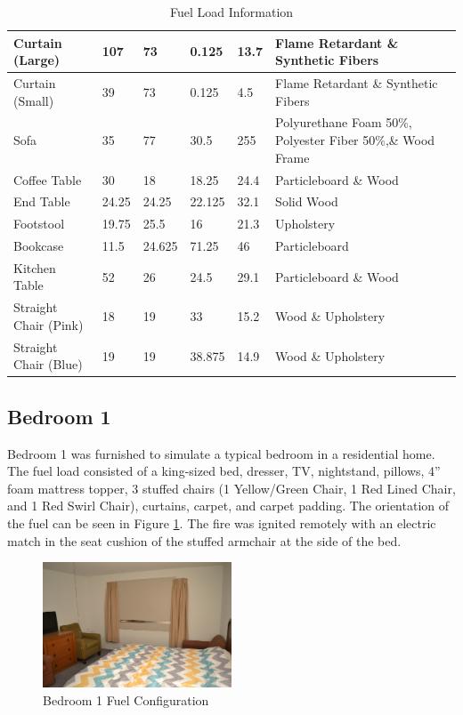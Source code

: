 \documentclass[12pt,oneside]{book}
\begin{document}
\begin{table}[H]
\begin{tabular}{|L{0.23\textwidth}|C{0.08\textwidth}|C{0.08\textwidth}|C{0.08\textwidth}|C{0.08\textwidth}|L{0.37\textwidth}|}
Curtain (Large) 			&107 			&73 			&0.125 			&13.7 			&Flame Retardant \& Synthetic Fibers \\ \hline
Curtain (Small) 			&39 			&73 			&0.125 			&4.5 			&Flame Retardant \& Synthetic Fibers \\ \hline
Sofa 						&35 			&77 			&30.5 			&255 			&Polyurethane Foam 50\%, Polyester Fiber 50\%,\& Wood Frame \\ \hline
Coffee Table 			 	&30 			&18 			&18.25 			&24.4 			&Particleboard \& Wood \\ \hline
End Table 			 		&24.25 			&24.25 			&22.125 		&32.1 			&Solid Wood \\ \hline
Footstool 					&19.75 			&25.5 			&16 			&21.3 			&Upholstery \\ \hline
Bookcase 					&11.5 			&24.625 		&71.25 			&46 			&Particleboard \\ \hline
Kitchen Table 				&52 			&26 			&24.5 			&29.1 			&Particleboard \& Wood \\ \hline
Straight Chair (Pink) 		&18 			&19 			&33 			&15.2 			&Wood \& Upholstery \\ \hline
Straight Chair (Blue) 		&19 			&19 			&38.875 		&14.9 			&Wood \& Upholstery \\ \hline
\end{tabular}
\caption{Fuel Load Information}
\label{table:fuel_weights}
\end{table}

\subsection*{Bedroom 1}
Bedroom 1 was furnished to simulate a typical bedroom in a residential home. The fuel load consisted of a king-sized bed, dresser, TV, nightstand, pillows, 4'' foam mattress topper, 3 stuffed chairs (1 Yellow/Green Chair, 1 Red Lined Chair, and 1 Red Swirl Chair), curtains, carpet, and carpet padding.  The orientation of the fuel can be seen in Figure \ref{figure:Bed1_fuel}. The fire was ignited remotely  with an electric match in the seat cushion of the stuffed armchair at the side of the bed.

\begin{figure}[H]
\centering
\includegraphics[width=0.50\textwidth]{0_Images/Ranch_Pictures/Exp_3_Fuel.jpg}
\caption{Bedroom 1 Fuel Configuration}
\label{figure:Bed1_fuel}
\end{figure}
\end{document}
